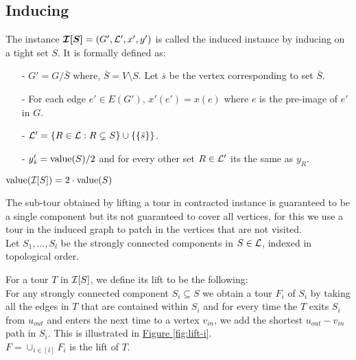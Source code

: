 \documentclass[./main.tex]{subfiles}
\begin{document}
	\subsection{Inducing}
	\begin{definition}
		The instance $\bm{\mathcal{I}[S]} = (G', \mathcal{L}', x', y')$ is called the induced instance by inducing on a tight set $S$. It is formally defined as:
		\begin{itemize}
			\item[-] $G' = G/\bar{S}$ where, $\bar{S} = V\setminus S$. Let $\bar{s}$ be the vertex corresponding to set $\bar{S}$.
			\item[-] For each edge $e' \in E(G')$, $x'(e') = x(e)$ where $e$ is the pre-image of $e'$ in $G$.
			\item[-] $\mathcal{L}' = \{R \in \mathcal{L} : R \subsetneq S\} \cup \{\{\bar{s}\}\}$.
			\item[-] $y'_{\bar{s}} = \textup{value}(S)/2$ and for every other set $R \in \mathcal{L}'$ its the same as $y_R$.\\
		\end{itemize}
	\end{definition}\vspace{2mm}

	\begin{fact}
		$\textup{value}(\mathcal{I}[S]) = 2\cdot\textup{value}(S)$
	\end{fact}

	The sub-tour obtained by lifting a tour in contracted instance is guaranteed to be a single component but its not guaranteed to cover all vertices, for this we use a tour in the induced graph to patch in the vertices that are not visited.\\

	
	Let $S_1, \dots, S_l$ be the strongly connected components in $S \in \mathcal{L}$, indexed in topological order.
	\begin{definition}\label{def:3:indu-lift}
		For a tour $T$ in $\mathcal{I}[S]$, we define its lift to be the following:\\
		For any strongly connected component $S_i \subseteq S$ we obtain a tour $F_i$ of $S_i$ by taking all the edges in $T$ that are contained within $S_i$ and for every time the $T$ exits $S_i$ from $u_{out}$ and enters the next time to a vertex $v_{in}$, we add the shortest $u_{out} - v_{in}$ path in $S_i$.
		This is illustrated in \hyperref[fig:lift-i]{Figure \ref{fig:lift-i}}.\\
		$F = \cup_{i \in [l]} F_i$ is the lift of $T$.\\
	\end{definition}
\end{document}
